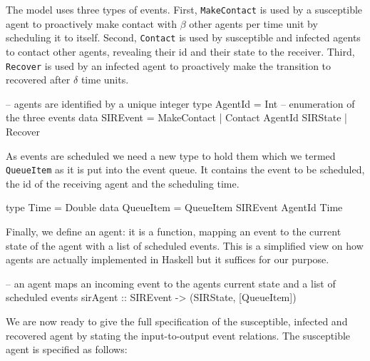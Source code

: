 The model uses three types of events. First, \texttt{MakeContact} is used by a susceptible agent to proactively make contact with $\beta$ other agents per time unit by scheduling it to itself. Second, \texttt{Contact} is used by susceptible and infected agents to contact other agents, revealing their id and their state to the receiver. Third, \texttt{Recover} is used by an infected agent to proactively make the transition to recovered after $\delta$ time units.

\begin{HaskellCode}
-- agents are identified by a unique integer
type AgentId = Int
-- enumeration of the three events
data SIREvent = MakeContact | Contact AgentId SIRState | Recover 
\end{HaskellCode}

As events are scheduled we need a new type to hold them which we termed \texttt{QueueItem} as it is put into the event queue. It contains the event to be scheduled, the id of the receiving agent and the scheduling time.

\begin{HaskellCode}
type Time      = Double
data QueueItem = QueueItem SIREvent AgentId Time
\end{HaskellCode}

Finally, we define an agent: it is a function, mapping an event to the current state of the agent with a list of scheduled events. This is a simplified view on how agents are actually implemented in Haskell but it suffices for our purpose.

\begin{HaskellCode}
-- an agent maps an incoming event to the agents current state and a list of scheduled events
sirAgent :: SIREvent -> (SIRState, [QueueItem])
\end{HaskellCode}


We are now ready to give the full specification of the susceptible, infected and recovered agent by stating the input-to-output event relations. The susceptible agent is specified as follows:

